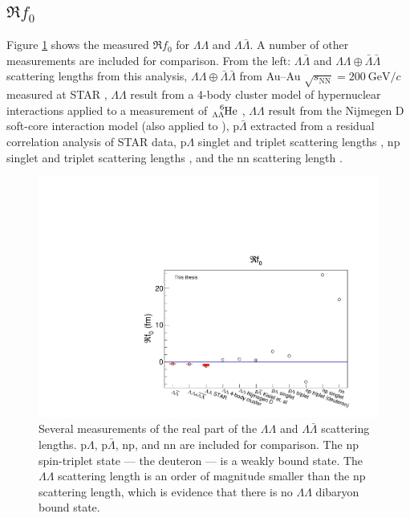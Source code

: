 


\subsection{$\Re f_0$}
\label{sec:Ref0Result}


Figure \ref{fig:Ref0} shows the measured $\Re f_0$ for $\Lambda\Lambda$ and $\Lambda\bar{\Lambda}$. A number of other measurements are included for comparison. From the left: $\Lambda\bar{\Lambda}$ and $\Lambda\Lambda \oplus \bar{\Lambda}\bar{\Lambda}$ scattering lengths from this analysis, $\Lambda\Lambda \oplus \bar{\Lambda}\bar{\Lambda}$ from Au--Au $\sqrt{s_{\mathrm{NN}}} = 200\ \mathrm{GeV}/c$ measured at STAR \cite{Adamczyk:2014vca}, $\Lambda\Lambda$ result from a 4-body cluster model of hypernuclear interactions \cite{Hiyama:2002yj} applied to a measurement of $\ce{^{6}_{\Lambda\Lambda}\mathrm{He}}$ \cite{Takahashi:2001nm}, $\Lambda\Lambda$ result from the Nijmegen D soft-core interaction model \cite{Filikhin:2002wm} (also applied to \cite{Hiyama:2002yj}), $\mathrm{p}\bar{\Lambda}$ extracted from a residual correlation analysis \cite{Kisiel:2014mma} of STAR data, $\mathrm{p}\Lambda$ singlet and triplet scattering lengths \cite{Wang:1999bf}, np singlet and triplet scattering lengths \cite{LANDAU1977502}, and the nn scattering length \cite{vonWitsch:1979uni}.

\begin{figure}[hbtp]
\includegraphics[width=36pc]{Figures/FitResults/2016-10-12-Ref0.pdf}
\caption[Measurements of $\Re f_0$ for various particle pairs]{Several measurements of the real part of the $\Lambda\Lambda$ and $\Lambda\bar{\Lambda}$ scattering lengths. p$\Lambda$, p$\bar{\Lambda}$, np, and nn are included for comparison. The np spin-triplet state --- the deuteron --- is a weakly bound state. The $\Lambda\Lambda$ scattering length is an order of magnitude smaller than the np scattering length, which is evidence that there is no $\Lambda\Lambda$ dibaryon bound state.}
\label{fig:Ref0}
\end{figure}

